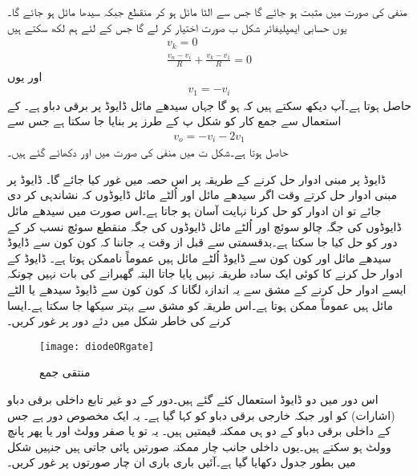 منفی  کی صورت میں  مثبت ہو جائے گا جس سے  الٹا مائل ہو کر منقطع جبکہ  سیدھا مائل ہو جائے گا۔یوں  حسابی ایمپلیفائر شکل  ب صورت اختیار کر لے گا جس کے لئے ہم لکھ سکتے ہیں
\begin{align*}
v_k=0\\
\frac{v_n-v_i}{R}+\frac{v_k-v_1}{R}=0
\end{align*}
اور یوں
\begin{align*}
v_1=-v_i
\end{align*}
حاصل ہوتا ہے۔آپ دیکھ سکتے ہیں کہ  ہو گا جہاں  سیدھے مائل ڈایوڈ  پر برقی دباو ہے۔  کے استعمال سے جمع کار کو شکل  پ کے طرز پر بنایا جا سکتا ہے جس سے
\begin{align*}
v_o=-v_i-2 v_1
\end{align*}
حاصل ہوتا ہے۔شکل  ت میں منفی  کی صورت میں  اور  دکھائے گئے ہیں۔

 ڈایوڈ پر مبنی ادوار حل کرنے کے طریقہ پر اس حصہ میں غور کیا جائے گا۔ ڈایوڈ پر مبنی ادوار حل کرتے وقت اگر سیدھے مائل اور اُلٹے مائل ڈایوڈوں  کہ نشاندہی کر دی جائے تو ان ادوار کو حل کرنا نہایت آسان ہو جاتا ہے۔اس صورت میں سیدھے مائل ڈایوڈوں کی جگہ چالو سوئچ اور اُلٹے مائل ڈایوڈوں  کی جگہ منقطع سوئچ نسب کر کے دور کو حل کیا جا سکتا ہے۔بدقسمتی سے قبل از وقت یہ جاننا کہ کون کون سے ڈایوڈ سیدھے مائل اور کون کون سے ڈایوڈ  اُلٹے مائل ہیں عموماً ناممکن ہوتا ہے۔ ڈایوڈ کے ادوار حل کرنے کا کوئی ایک سادہ طریقہ نہیں پایا جاتا البتہ گھبرانے کی بات نہیں چونکہ ایسے ادوار حل کرنے کے مشق سے یہ اندازہ لگانا کہ کون کون سے ڈایوڈ سیدھے یا الٹے مائل ہیں عموماً ممکن ہوتا ہے۔اس طریقہ کو مشق سے بہتر سیکھا جا سکتا ہے۔ایسا کرنے کی خاطر شکل  میں دئے دور پر غور کریں۔
\begin{figure}
\centering
\texttt{[image: diodeORgate]}
\caption{منتقی جمع}
\label{شکل_منتقی_جمع}
\end{figure}

اس دور میں دو ڈایوڈ استعمال کئے گئے ہیں۔دور کے دو غیر تابع داخلی برقی دباو (اشارات) کو  اور  جبکہ خارجی برقی دباو کو  کہا گیا ہے۔ یہ ایک مخصوص دور ہے جس کے داخلی برقی دباو کے دو ہی ممکنہ قیمتیں ہیں۔ یہ تو یا صفر وولٹ    اور یا پھر پانچ وولٹ   ہو سکتے ہیں۔یوں داخلی جانب چار ممکنہ صورتیں پائی جاتی ہیں جنہیں شکل میں بطور جدول  دکھایا گیا ہے۔آئیں باری باری ان چار صورتوں پر غور کریں۔

